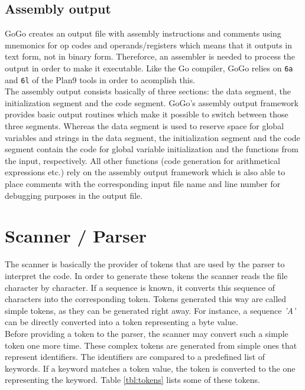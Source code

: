 \documentclass[a4paper]{scrreprt}
\begin{document}
    \section{Assembly output}
      GoGo creates an output file with assembly instructions and comments using mnemonics for op codes and operands/registers which means that it outputs in text form, not in binary form. Thereforce, an assembler is needed to process the output in order to make it executable. Like the Go compiler, GoGo relies on \texttt{6a} and \texttt{6l} of the Plan9 tools in order to acomplish this\cite{pik00}.\\
      The assembly output consists basically of three sections: the data segment, the initialization segment and the code segment. GoGo's assembly output framework provides basic output routines which make it possible to switch between those three segments. Whereas the data segment is used to reserve space for global variables and strings in the data segment, the initialization segment and the code segment contain the code for global variable initialization and the functions from the input, respectively. All other functions (code generation for arithmetical expressions etc.) rely on the assembly output framework which is also able to place comments with the corresponding input file name and line number for debugging purposes in the output file.

  \chapter{Scanner / Parser}
    The scanner is basically the provider of tokens that are used by the parser
    to interpret the code. In order to generate these tokens the scanner reads
    the file character by character. If a sequence is known, it converts this 
    sequence of characters into the corresponding token. Tokens generated this
    way are called simple tokens, as they can be generated right away. For 
    instance, a sequence \textit{'A'} can be directly converted into a token 
    representing a byte value. \\
    Before providing a token to the parser, the scanner may convert such a 
    simple token one more time. These complex tokens are generated from simple
    ones that represent identifiers. The identifiers are compared to a 
    predefined list of keywords. If a keyword matches a token value, the token
    is converted to the one representing the keyword. Table \ref{tbl:tokens} 
    lists some of these tokens.
\end{document}
